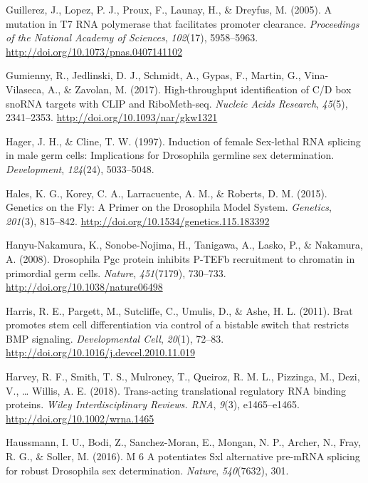 \documentclass[12pt,oneside]{reedthesis}
\newlength{\cslhangindent}
\newenvironment{cslreferences}%
  {\setlength{\parindent}{0pt}%
  \everypar{\setlength{\hangindent}{\cslhangindent}}\ignorespaces}%
  {\par}
\begin{document}
\begin{cslreferences}
\leavevmode\hypertarget{ref-guillerezMutationT7RNA2005}{}%
Guillerez, J., Lopez, P. J., Proux, F., Launay, H., \& Dreyfus, M. (2005). A mutation in T7 RNA polymerase that facilitates promoter clearance. \emph{Proceedings of the National Academy of Sciences}, \emph{102}(17), 5958--5963. \url{http://doi.org/10.1073/pnas.0407141102}

\leavevmode\hypertarget{ref-Gumienny2017c}{}%
Gumienny, R., Jedlinski, D. J., Schmidt, A., Gypas, F., Martin, G., Vina-Vilaseca, A., \& Zavolan, M. (2017). High-throughput identification of C/D box snoRNA targets with CLIP and RiboMeth-seq. \emph{Nucleic Acids Research}, \emph{45}(5), 2341--2353. \url{http://doi.org/10.1093/nar/gkw1321}

\leavevmode\hypertarget{ref-Hager1997}{}%
Hager, J. H., \& Cline, T. W. (1997). Induction of female Sex-lethal RNA splicing in male germ cells: Implications for Drosophila germline sex determination. \emph{Development}, \emph{124}(24), 5033--5048.

\leavevmode\hypertarget{ref-Hales2015a}{}%
Hales, K. G., Korey, C. A., Larracuente, A. M., \& Roberts, D. M. (2015). Genetics on the Fly: A Primer on the Drosophila Model System. \emph{Genetics}, \emph{201}(3), 815--842. \url{http://doi.org/10.1534/genetics.115.183392}

\leavevmode\hypertarget{ref-Hanyu-Nakamura2008g}{}%
Hanyu-Nakamura, K., Sonobe-Nojima, H., Tanigawa, A., Lasko, P., \& Nakamura, A. (2008). Drosophila Pgc protein inhibits P-TEFb recruitment to chromatin in primordial germ cells. \emph{Nature}, \emph{451}(7179), 730--733. \url{http://doi.org/10.1038/nature06498}

\leavevmode\hypertarget{ref-Harris2011i}{}%
Harris, R. E., Pargett, M., Sutcliffe, C., Umulis, D., \& Ashe, H. L. (2011). Brat promotes stem cell differentiation via control of a bistable switch that restricts BMP signaling. \emph{Developmental Cell}, \emph{20}(1), 72--83. \url{http://doi.org/10.1016/j.devcel.2010.11.019}

\leavevmode\hypertarget{ref-Harvey2018f}{}%
Harvey, R. F., Smith, T. S., Mulroney, T., Queiroz, R. M. L., Pizzinga, M., Dezi, V., \ldots{} Willis, A. E. (2018). Trans-acting translational regulatory RNA binding proteins. \emph{Wiley Interdisciplinary Reviews. RNA}, \emph{9}(3), e1465--e1465. \url{http://doi.org/10.1002/wrna.1465}

\leavevmode\hypertarget{ref-Haussmann2016}{}%
Haussmann, I. U., Bodi, Z., Sanchez-Moran, E., Mongan, N. P., Archer, N., Fray, R. G., \& Soller, M. (2016). M 6 A potentiates Sxl alternative pre-mRNA splicing for robust Drosophila sex determination. \emph{Nature}, \emph{540}(7632), 301.


\end{cslreferences}
\end{document}
